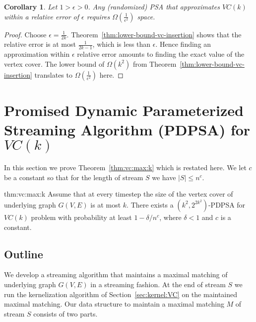 \documentclass[11pt,letter]{article}
\newtheorem{corollary}[theorem]{Corollary}
\begin{document}
\begin{corollary}
Let $1>\epsilon>0$. Any (randomized) PSA that approximates $VC(k)$ within a relative error of
$\epsilon$ requires $\Omega(\frac{1}{\epsilon^2})$ space.
\end{corollary}

\begin{proof}
Choose $\epsilon=\frac{1}{2k}$. Theorem~\ref{thm:lower-bound-vc-insertion}
shows that the relative error is at most $\frac{1}{2k-1}$, which is less than $\epsilon$.
Hence finding an approximation within $\epsilon$ relative error amounts to
finding the exact value of the vertex cover. The lower bound of $\Omega(k^2)$
from Theorem~\ref{thm:lower-bound-vc-insertion} translates to $\Omega(\frac{1}{\epsilon^2})$ here.
\end{proof}




\section{Promised Dynamic Parameterized Streaming Algorithm (PDPSA) for $VC(k)$}
\label{sec:promised:dynamic}
In this section we prove Theorem~\ref{thm:vc:max:k} which is restated here.
We let $c$ be a constant so that for the length of stream $S$ we have $|S|\le n^c$.

\begin{reptheorem}{thm:vc:max:k}
Assume that at every timestep
the size of the vertex cover of underlying graph $G(V,E)$ is at most $k$.
There exists a $(k^2,2^{2k^2})$-PDPSA for $VC(k)$ problem with probability at least $1-\delta/n^c$,
where $\delta<1$ and $c$ is a constant.
\end{reptheorem}



\subsection{Outline}
We develop a streaming algorithm that maintains a maximal matching of underlying graph $G(V,E)$
in a streaming fashion.
At the end of stream $S$ we run the kernelization algorithm of Section~\ref{sec:kernel:VC}
on the maintained maximal matching.
Our data structure to maintain a maximal matching $M$ of stream $S$ consists of two parts.
\end{document}

